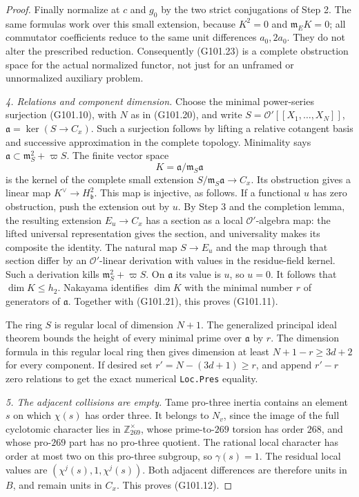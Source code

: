 \begin{proof}
Finally normalize at \(c\) and \(g_0\) by the two strict
conjugations of Step 2.  The same formulas work over this
small extension, because \(K^2=0\) and
\(\mathfrak m_EK=0\); all commutator coefficients reduce to
the same unit differences \(a_0,2a_0\).
They do not alter the prescribed reduction.
Consequently (G101.23) is a complete obstruction space for
the actual normalized functor, not just for an unframed
or unnormalized auxiliary problem.

\emph{4. Relations and component dimension.}
Choose the minimal power-series surjection (G101.10), with
\(N\) as in (G101.20), and write \(S=\mathcal O'[[X_1,\ldots,X_N]]\),
\(\mathfrak a=\ker(S\to C_x)\).
Such a surjection follows by lifting a relative cotangent basis
and successive approximation in the complete topology.
Minimality says
\(\mathfrak a\subset\mathfrak m_S^2+\varpi S\).
The finite vector space
\[
                         K=\mathfrak a/\mathfrak m_S\mathfrak a
 \tag{G101.24}
\]
is the kernel of the complete small extension
\(S/\mathfrak m_S\mathfrak a\to C_x\).
Its obstruction gives a linear map
\(K^\vee\to H^2_{\mathfrak b}\).
This map is injective, as follows.
If a functional \(u\) has zero obstruction, push the extension
out by \(u\).  By Step 3 and the completion lemma, the resulting
extension \(E_u\to C_x\) has a section as a local
\(\mathcal O'\)-algebra map: the lifted universal representation
gives the section, and universality makes its composite the identity.
The natural map \(S\to E_u\) and the map through that section
differ by an \(\mathcal O'\)-linear derivation with values in
the residue-field kernel.
Such a derivation kills \(\mathfrak m_S^2+\varpi S\).
On \(\mathfrak a\) its value is \(u\), so \(u=0\).
It follows that \(\dim K\le h_2\).
Nakayama identifies \(\dim K\) with the minimal number \(r\)
of generators of \(\mathfrak a\).
Together with (G101.21), this proves (G101.11).

The ring \(S\) is regular local of dimension \(N+1\).
The generalized principal ideal theorem bounds the height of
every minimal prime over \(\mathfrak a\) by \(r\).
The dimension formula in this regular local ring then gives
dimension at least \(N+1-r\ge3d+2\) for every component.
If desired set \(r'=N-(3d+1)\ge r\), and append \(r'-r\)
zero relations to get the exact numerical
\texttt{Loc.Pres} equality.

\emph{5. The adjacent collisions are empty.}
Tame pro-three inertia contains an element \(s\) on which
\(\chi(s)\) has order three.
It belongs to \(N_v\), since the image of the full cyclotomic
character lies in
\(\mathbb Z_{269}^{\times}\), whose prime-to-\(269\) torsion
has order \(268\), and whose pro-\(269\) part has no
pro-three quotient.
The rational local character has order at most two on
this pro-three subgroup, so \(\gamma(s)=1\).
The residual local values are
\((\chi^j(s),1,\chi^j(s))\).
Both adjacent differences are therefore units in \(B\), and
remain units in \(C_x\).  This proves (G101.12).


\end{proof}
